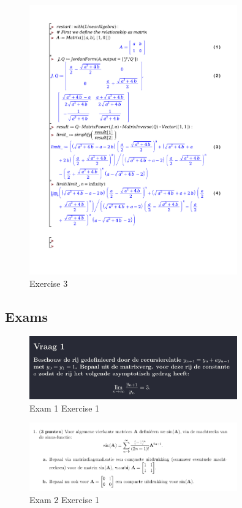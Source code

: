 \documentclass[a4paper]{report}
\begin{document}
\begin{figure}[H]
	\centering
	\includegraphics[width=0.8\textwidth]{exercises/wc_3_ex_3.pdf}
	\caption{Exercise 3}
	\label{fig:wc_3_ex_3}
\end{figure}

\subsection{Exams}

\begin{figure}[H]
	\centering
	\includegraphics[width=0.8\textwidth]{assets/exam_1_ex_1.png}
	\caption{Exam 1 Exercise 1}
	\label{fig:exam_1_ex_1}
\end{figure}




\begin{figure}[H]
	\centering
	\includegraphics[width=0.8\textwidth]{assets/exam_2_ex_1.png}
	\caption{Exam 2 Exercise 1}
	\label{fig:exam_2_ex_1}
\end{figure}
\end{document}
